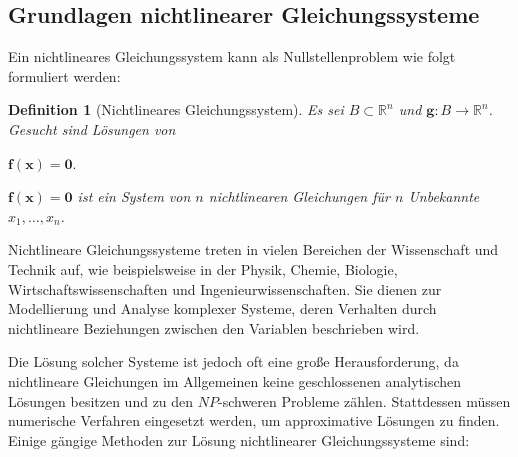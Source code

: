 \documentclass{article}
\theoremstyle{newline}
\newtheorem{definition}{Definition}[section]
\begin{document}
\begin{onehalfspace}
\begin{abstract}
\end{abstract}
\newpage


\tableofcontents	%
\thispagestyle{empty}

\newpage		

\section{Grundlagen nichtlinearer Gleichungssysteme}

Ein nichtlineares Gleichungssystem kann als Nullstellenproblem wie folgt formuliert werden:

\begin{definition}[Nichtlineares Gleichungssystem]
	Es sei $B \subset \mathbb{R}^n$ und $\mathbf{g}: B \rightarrow \mathbb{R}^n$. Gesucht sind Lösungen von
	
	\begin{center}
		$\mathbf{f}(\mathbf{x}) = \mathbf{0}.$
	\end{center}
	
	$\mathbf{f}(\mathbf{x}) = \mathbf{0}$ ist ein System von $n$ nichtlinearen Gleichungen für $n$ Unbekannte $x_1, \dots, x_n$.
	\\
	
	\begin{center}
	\end{center}
	\cite{Merzigera}
\end{definition}
\bigskip

Nichtlineare Gleichungssysteme treten in vielen Bereichen der Wissenschaft und Technik auf, wie beispielsweise in der Physik, Chemie, Biologie, Wirtschaftswissenschaften und Ingenieurwissenschaften. Sie dienen zur Modellierung und Analyse komplexer Systeme, deren Verhalten durch nichtlineare Beziehungen zwischen den Variablen beschrieben wird.

Die Lösung solcher Systeme ist jedoch oft eine große Herausforderung, da nichtlineare Gleichungen im Allgemeinen keine geschlossenen analytischen Lösungen besitzen und zu den $NP$-schweren Probleme zählen. Stattdessen müssen numerische Verfahren eingesetzt werden, um approximative Lösungen zu finden. Einige gängige Methoden zur Lösung nichtlinearer Gleichungssysteme sind:


\end{onehalfspace}
\end{document}
